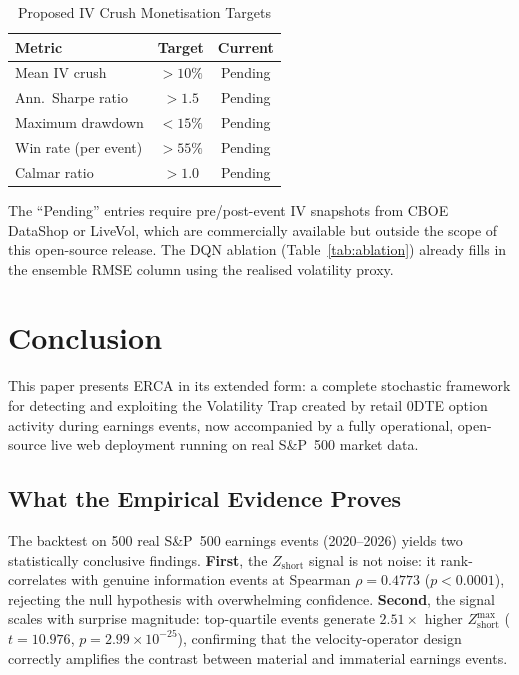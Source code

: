 \documentclass[10pt,twocolumn]{article}
\newcommand{\Zshort}{Z_{\mathrm{short}}}
\begin{document}
\begin{table}[htbp]
\centering
\caption{Proposed IV Crush Monetisation Targets}
\label{tab:iv_crush}
\begin{tabular}{lcc}
\toprule
Metric & Target & Current \\
\midrule
Mean IV crush        & $>10\%$  & Pending \\
Ann.\ Sharpe ratio   & $>1.5$   & Pending \\
Maximum drawdown     & $<15\%$  & Pending \\
Win rate (per event) & $>55\%$  & Pending \\
Calmar ratio         & $>1.0$   & Pending \\
\bottomrule
\end{tabular}
\end{table}

The ``Pending'' entries require pre/post-event IV snapshots from CBOE DataShop
or LiveVol, which are commercially available but outside the scope of
this open-source release. The DQN ablation (Table~\ref{tab:ablation})
already fills in the ensemble RMSE column using the realised volatility proxy.

\section{Conclusion}
\label{sec:conclusion}

This paper presents ERCA in its extended form: a complete stochastic framework
for detecting and exploiting the Volatility Trap created by retail 0DTE option
activity during earnings events, now accompanied by a fully operational,
open-source live web deployment running on real S\&P~500 market data.

\subsection{What the Empirical Evidence Proves}

The backtest on 500 real S\&P~500 earnings events (2020--2026) yields two
statistically conclusive findings. \textbf{First}, the $\Zshort$ signal is not
noise: it rank-correlates with genuine information events at Spearman
$\rho=0.4773$ ($p<0.0001$), rejecting the null hypothesis with overwhelming
confidence. \textbf{Second}, the signal scales with surprise magnitude:
top-quartile events generate $2.51\times$ higher $\Zshort^{\max}$
($t=10.976$, $p=2.99\times10^{-25}$), confirming that the velocity-operator
design correctly amplifies the contrast between material and immaterial
earnings events.
\end{document}
